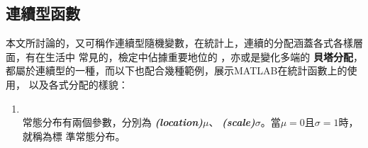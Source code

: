 		\subsection{連續型函數}
			本文所討論的，又可稱作連續型隨機變數，在統計上，連續的分配涵蓋各式各樣層面，有在生活中				常見的\textbf{\color{darkblue}{常態分配}}，檢定中佔據重要地位的								\textbf{\color{darkblue}{卡方分配}}，亦或是變化多端的\textbf{\color{darkblue}				{貝塔分配}}，都屬於連續型的一種，而以下也配合幾種範例，展示MATLAB在統計函數上的使用，				以及各式分配的樣貌：
			\begin{enumerate}			
				\item{\textbf{}\\
					常態分布有兩個參數，分別為\textbf{\color{darkblue}{位置參數}									\emph{(location)}}\quad $\mu$、\textbf{\color{darkblue}{尺度參數}							\emph{(scale)}}\quad $\sigma$。當$\mu = 0$且$\sigma = 1$時，就稱為標						準常態分布。

}
\end{enumerate}
